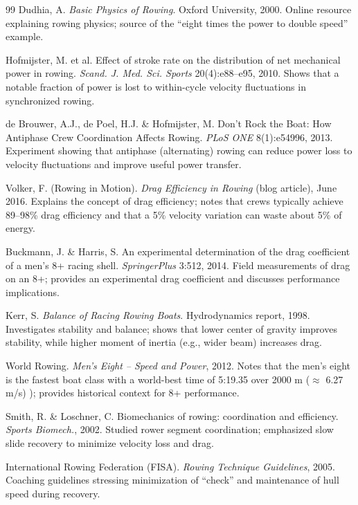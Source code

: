 \documentclass[12pt]{article}
\begin{document}
\begin{thebibliography}{99}
Dudhia, A. \textit{Basic Physics of Rowing}. Oxford University, 2000.
Online resource explaining rowing physics; source of the “eight times the power to double speed” example.

Hofmijster, M. et al.
Effect of stroke rate on the distribution of net mechanical power in rowing.
\textit{Scand. J. Med. Sci. Sports} 20(4):e88–e95, 2010.
Shows that a notable fraction of power is lost to within-cycle velocity fluctuations in synchronized rowing.

de Brouwer, A.J., de Poel, H.J. \& Hofmijster, M.
Don’t Rock the Boat: How Antiphase Crew Coordination Affects Rowing.
\textit{PLoS ONE} 8(1):e54996, 2013.
Experiment showing that antiphase (alternating) rowing can reduce power loss to velocity fluctuations and improve useful power transfer.

Volker, F. (Rowing in Motion).
\textit{Drag Efficiency in Rowing} (blog article), June 2016.
Explains the concept of drag efficiency; notes that crews typically achieve 89–98\% drag efficiency and that a 5\% velocity variation can waste about 5\% of energy.

Buckmann, J. \& Harris, S.
An experimental determination of the drag coefficient of a men’s 8+ racing shell.
\textit{SpringerPlus} 3:512, 2014.
Field measurements of drag on an 8+; provides an experimental drag coefficient and discusses performance implications.

Kerr, S. \textit{Balance of Racing Rowing Boats}. Hydrodynamics report, 1998.
Investigates stability and balance; shows that lower center of gravity improves stability, while higher moment of inertia (e.g., wider beam) increases drag.

World Rowing.
\textit{Men’s Eight – Speed and Power}, 2012.
Notes that the men’s eight is the fastest boat class with a world-best time of 5:19.35 over 2000 m ($\approx$ 6.27 m/s)
); provides historical context for 8+ performance.

Smith, R. \& Loschner, C.
Biomechanics of rowing: coordination and efficiency.
\textit{Sports Biomech.}, 2002.
Studied rower segment coordination; emphasized slow slide recovery to minimize velocity loss and drag.

International Rowing Federation (FISA).
\textit{Rowing Technique Guidelines}, 2005.
Coaching guidelines stressing minimization of “check” and maintenance of hull speed during recovery.


\end{thebibliography}
\end{document}
